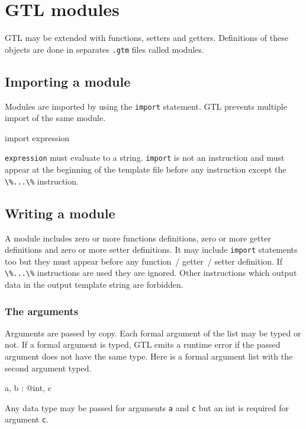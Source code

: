 \documentclass[10pt,openright,twosides,final]{memoir}
\newcommand{\gtltype}[1]{{\small\ttfamily #1}}
\newcommand{\gtlinline}[1]{\colorbox{light-blue}{\lstinline[language=gtl]{#1}}}
\begin{document}
\chapter{GTL modules}
\label{chap:modules}

GTL may be extended with functions, setters and getters. Definitions of these objects are done in  separates \texttt{\footnotesize .gtm} files called modules.

\section{Importing a module}

Modules are imported by using the \gtlinline{import} statement. GTL prevents multiple import of the same module.

\begin{gtl}
import expression
\end{gtl}

\gtlinline{expression} must evaluate to a \gtltype{string}. \gtlinline{import} is not an instruction and must appear at the beginning of the template file before any instruction except the \gtlinline{\%...\%} instruction.

\section{Writing a module}

A module includes zero or more functions definitions, zero or more getter definitions and zero or more setter definitions. It may include \gtlinline{import} statements too but they must appear before any function~/ getter~/ setter definition. If  \gtlinline{\%...\%} instructions are used they are ignored. Other instructions which output data in the output template string are forbidden.

\subsection{The arguments}

Arguments are passed by copy. Each formal argument of the list may be typed or not. If a formal argument is typed, GTL emits a runtime error if the passed argument does not have the same type. Here is a formal argument list with the second argument typed.

\begin{gtl}
a, b : @int, c
\end{gtl}

Any data type may be passed for arguments \gtlinline{a} and \gtlinline{c} but an \gtltype{int} is required for argument \gtlinline{c}.
\end{document}

